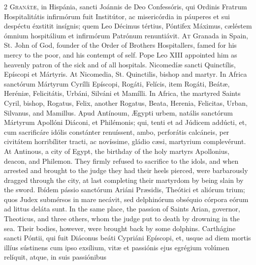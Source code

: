 \begin{paracol}{2}
\lettrine[lines=2]{G}{ranátæ,} in Hispánia, sancti Joánnis de Deo 
 Confessóris, qui Ordinis Fratrum Hospitalitátis infirmórum fuit Institútor, 
 ac misericórdia in páuperes et sui despéctu éxstitit insígnis; quem Leo 
 Décimus tértius, Póntifex Máximus, cæléstem ómnium hospitálium et infirmórum 
 Patrónum renuntiávit.
\switchcolumn
{}
\lettrine[lines=2]{A}{t} Granada in Spain, St. John of God, founder of the Order of Brothers 
 Hospitallers, famed for his mercy to the poor, and his contempt of self. 
 Pope Leo XIII appointed him as heavenly patron of the sick and of all 
 hospitals.
\switchcolumn*
{}
Nicomedíæ sancti Quinctílis, Epíscopi et 
 Mártyris.
\switchcolumn
{}
At Nicomedia, St. Quinctilis, bishop and martyr.
\switchcolumn*
{}
In Africa sanctórum Mártyrum Cyrílli Epíscopi, Rogáti, Felícis, item Rogáti, 
 Beátæ, Heréniæ, Felicitátis, Urbáni, Silváni et 
 Mamílli.
\switchcolumn
{}
In Africa, the martyred Saints Cyril, bishop, Rogatus, Felix, another 
 Rogatus, Beata, Herenia, Felicitas, Urban, Silvanus, and Mamillus.
\switchcolumn*
{}
Apud Antínoum, Ægypti urbem, natális sanctórum 
 Mártyrum Apollóni Diáconi, et Philémonis; qui, tenti et ad Júdicem addúcti, 
 et, cum sacrificáre idólis constánter renuíssent, ambo, perforátis calcáneis, 
 per civitátem horribíliter tracti, ac novíssime, gládio cæsi, martyrium 
 complevérunt.
\switchcolumn
{}
At Antinous, a city of Egypt, the birthday of the holy martyrs Apollonius, 
 deacon, and Philemon. They firmly refused to sacrifice to the idols, 
 and when arrested and brought to the judge they had their heels pierced, 
 were barbarously dragged through the city, at last completing their 
 martyrdom by being slain by the sword.
\switchcolumn*
{}
Ibídem pássio sanctórum Ariáni Præsidis, 
 Theótici et aliórum trium; quos Judex submérsos in mare necávit, sed 
 delphinórum obséquio córpora eórum ad littus deláta sunt.
\switchcolumn
{}
In the same place, the passion of Saints Arian, governor, Theoticus, and 
 three others, whom the judge put to death by drowning in the sea. 
 Their bodies, however, were brought back by some dolphins.
\switchcolumn*
{}
Carthágine sancti Póntii, qui fuit Diáconus beáti Cypriáni Epíscopi, et, 
 usque ad diem mortis illíus sústinens cum ipso exsílium, vitæ 
 et passiónis ejus egrégium volúmen relíquit, atque, in suis passiónibus 

\end{paracol}

